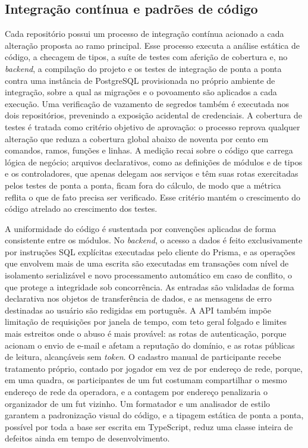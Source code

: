     \subsection{Integração contínua e padrões de código}
      Cada repositório possui um processo de integração contínua acionado a cada alteração proposta ao ramo principal. Esse processo executa a análise estática de código, a checagem de tipos, a suíte de testes com aferição de cobertura e, no \textit{backend}, a compilação do projeto e os testes de integração de ponta a ponta contra uma instância de PostgreSQL provisionada no próprio ambiente de integração, sobre a qual as migrações e o povoamento são aplicados a cada execução. Uma verificação de vazamento de segredos também é executada nos dois repositórios, prevenindo a exposição acidental de credenciais. A cobertura de testes é tratada como critério objetivo de aprovação: o processo reprova qualquer alteração que reduza a cobertura global abaixo de noventa por cento em comandos, ramos, funções e linhas. A medição recai sobre o código que carrega lógica de negócio; arquivos declarativos, como as definições de módulos e de tipos e os controladores, que apenas delegam aos serviços e têm suas rotas exercitadas pelos testes de ponta a ponta, ficam fora do cálculo, de modo que a métrica reflita o que de fato precisa ser verificado. Esse critério mantém o crescimento do código atrelado ao crescimento dos testes.

      A uniformidade do código é sustentada por convenções aplicadas de forma consistente entre os módulos. No \textit{backend}, o acesso a dados é feito exclusivamente por instruções SQL explícitas executadas pelo cliente do Prisma, e as operações que envolvem mais de uma escrita são executadas em transações com nível de isolamento serializável e novo processamento automático em caso de conflito, o que protege a integridade sob concorrência. As entradas são validadas de forma declarativa nos objetos de transferência de dados, e as mensagens de erro destinadas ao usuário são redigidas em português. A API também impõe limitação de requisições por janela de tempo, com teto geral folgado e limites mais estreitos onde o abuso é mais provável: as rotas de autenticação, porque acionam o envio de e-mail e afetam a reputação do domínio, e as rotas públicas de leitura, alcançáveis sem \textit{token}. O cadastro manual de participante recebe tratamento próprio, contado por jogador em vez de por endereço de rede, porque, em uma quadra, os participantes de um fut costumam compartilhar o mesmo endereço de rede da operadora, e a contagem por endereço penalizaria o organizador de um fut vizinho. Um formatador e um analisador de estilo garantem a padronização visual do código, e a tipagem estática de ponta a ponta, possível por toda a base ser escrita em TypeScript, reduz uma classe inteira de defeitos ainda em tempo de desenvolvimento.

